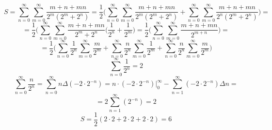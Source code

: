 


	$$S = \sum_{n = 0}^{\infty} \sum_{m = 0}^{\infty} \frac{m+n+mn}{2^m (2^m+2^n)} = \frac{1}{2}\Bigg(\sum_{n = 0}^{\infty} \sum_{m = 0}^{\infty} \frac{m+n+mn}{2^m (2^m+2^n)}+\sum_{n = 0}^{\infty} \sum_{m = 0}^{\infty} \frac{m+n+mn}{2^n (2^m+2^n)}\Bigg) =$$
	$$=\frac{1}{2}\Bigg(\sum_{n = 0}^{\infty} \sum_{m = 0}^{\infty} \frac{m+n+mn}{2^m+2^n} (\frac{1}{2^n}+\frac{1}{2^m}\Bigg) = \frac{1}{2}\Bigg(\sum_{n = 0}^{\infty} \sum_{m = 0}^{\infty} \frac{m+n+mn}{2^{m+n}}\Bigg)=$$
	$$= \frac{1}{2}\Bigg(\sum_{n = 0}^{\infty} \frac{1}{2^n} \sum_{m = 0}^{\infty} \frac{m}{2^m} + \sum_{n = 0}^{\infty} \frac{n}{2^n} \sum_{m = 0}^{\infty} \frac{1}{2^m} + \sum_{n = 0}^{\infty} \frac{n}{2^n} \sum_{m = 0}^{\infty} \frac{m}{2^m}\Bigg)$$
	$$\sum_{n = 0}^{\infty} \frac{1}{2^n} = 2$$
	$$\sum_{n = 0}^{\infty} \frac{n}{2^n} = \sum_{n = 0}^{\infty} n \Delta(-2\cdot 2^{-n}) = n\cdot (-2\cdot 2^{-n}) \Bigg|_{0}^{\infty}-\sum_{n = 1}^{\infty} (-2\cdot 2^{-n}) \Delta n = $$
	$$= 2\sum_{n = 1}^{\infty} ( 2^{-n}) = 2$$
	$$S = \frac{1}{2} (2\cdot 2+2\cdot 2+2\cdot 2) = 6$$
	
